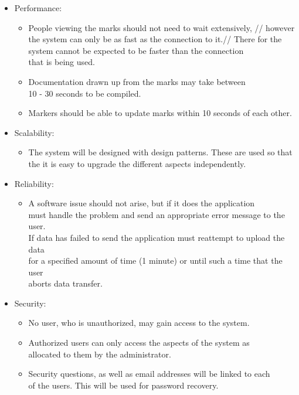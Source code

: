 \documentclass[12pt]{article}
\begin{document}
	\begin{itemize}
		\item Performance:
		\begin{itemize}
			\item 	People viewing the marks should not need to wait extensively, //
		 			however the system can only be as fast as the connection to it.//
		 			There for the system cannot be expected to be faster than the connection\\
		 			that is being used.
			\item Documentation drawn up from the marks may take between  \\
					10 - 30 seconds to be compiled.
			\item Markers should be able to update marks within 10 seconds of each other.
		\end{itemize}
		
		\item Scalability:
		\begin{itemize}
			\item The system will be designed with design patterns. These are used so that\\
			the it is easy to upgrade the different aspects independently. \\   
		\end{itemize}

		\item Reliability:
		\begin{itemize}
			\item A software issue should not arise, but if it does the application \\
			must handle the problem and send an appropriate error message to the user. \\
			If data has failed to send the application must reattempt to upload the data \\
			for a specified amount of time (1 minute) or until such a time that the user \\
			aborts data transfer.		
		\end{itemize}
			
			
		\item Security:
				\begin{itemize}
				\item No user, who is unauthorized, may gain access to the system.
				\item Authorized users can only access the aspects of the system as \\
				allocated to them by the administrator.
				\item Security questions, as well as email addresses will be linked to each\\
					of the users. This will be used for password recovery.
				\end{itemize}
				

\end{itemize}
\end{document}
